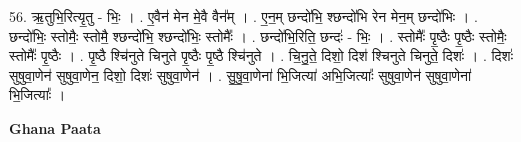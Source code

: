 \documentclass[17pt]{extarticle}
\begin{document}
56. ऋ॒तुभि॒रित्यृ॒तु - भिः॒ । . ए॒वैन॑ मेन मे॒वै वैन᳚म् । . ए॒न॒म् छन्दो॑भि॒ श्छन्दो॑भि रेन मेन॒म् छन्दो॑भिः । . छन्दो॑भिः॒ स्तोमैः॒ स्तोमै॒ श्छन्दो॑भि॒ श्छन्दो॑भिः॒ स्तोमैः᳚ । . छन्दो॑भि॒रिति॒ छन्दः॑ - भिः॒ । . स्तोमैः᳚ पृ॒ष्ठैः पृ॒ष्ठैः स्तोमैः॒ स्तोमैः᳚ पृ॒ष्ठैः । . पृ॒ष्ठै श्चि॑नुते चिनुते पृ॒ष्ठैः पृ॒ष्ठै श्चि॑नुते । . चि॒नु॒ते॒ दिशो॒ दिश॑ श्चिनुते चिनुते॒ दिशः॑ । . दिशः॑ सुषुवा॒णेन॑ सुषुवा॒णेन॒ दिशो॒ दिशः॑ सुषुवा॒णेन॑ । . सु॒षु॒वा॒णेना॑ भि॒जित्या॑ अभि॒जित्याः᳚ सुषुवा॒णेन॑ सुषुवा॒णेना॑ भि॒जित्याः᳚ । \newline

\textbf{Ghana Paata } \newline
\end{document}
